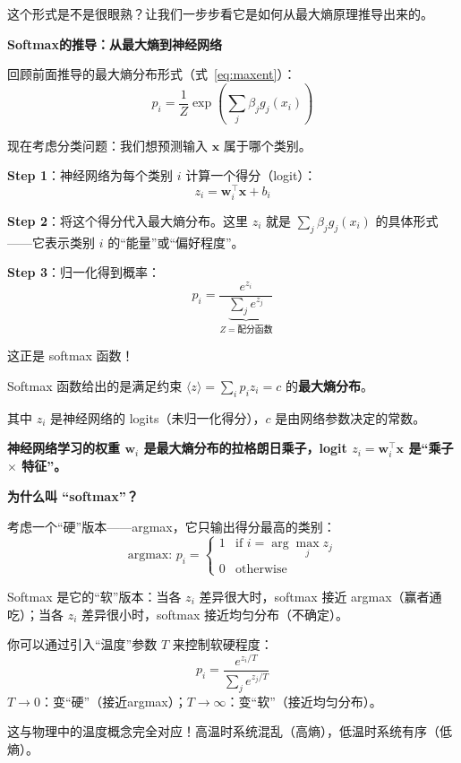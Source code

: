 这个形式是不是很眼熟？让我们一步步看它是如何从最大熵原理推导出来的。

\begin{insightbox}
\textbf{Softmax的推导：从最大熵到神经网络}

回顾前面推导的最大熵分布形式（式~\eqref{eq:maxent}）：
\[
p_i = \frac{1}{Z} \exp\left( \sum_j \beta_j g_j(x_i) \right)
\]

现在考虑分类问题：我们想预测输入 $\bm{x}$ 属于哪个类别。

\textbf{Step 1}：神经网络为每个类别 $i$ 计算一个得分（logit）：
\[
z_i = \bm{w}_i^\top \bm{x} + b_i
\]

\textbf{Step 2}：将这个得分代入最大熵分布。这里 $z_i$ 就是 $\sum_j \beta_j g_j(x_i)$ 的具体形式——它表示类别 $i$ 的“能量”或“偏好程度”。

\textbf{Step 3}：归一化得到概率：
\[
p_i = \frac{e^{z_i}}{\underbrace{\sum_j e^{z_j}}_{Z = \text{配分函数}}}
\]

这正是 softmax 函数！
\end{insightbox}

\begin{unification}[title=Softmax的最大熵解释]
Softmax 函数给出的是满足约束 $\langle z \rangle = \sum_i p_i z_i = c$ 的\textbf{最大熵分布}。

其中 $z_i$ 是神经网络的 logits（未归一化得分），$c$ 是由网络参数决定的常数。

\textbf{神经网络学习的权重 $\bm{w}_i$ 是最大熵分布的拉格朗日乘子，logit $z_i = \bm{w}_i^\top \bm{x}$ 是“乘子 $\times$ 特征”。}
\end{unification}

\begin{physicalmeaning}
\textbf{为什么叫 “softmax”？}

考虑一个“硬”版本——argmax，它只输出得分最高的类别：
\[
\text{argmax: } p_i = \begin{cases} 1 & \text{if } i = \arg\max_j z_j \\ 0 & \text{otherwise} \end{cases}
\]

Softmax 是它的“软”版本：当各 $z_i$ 差异很大时，softmax 接近 argmax（赢者通吃）；当各 $z_i$ 差异很小时，softmax 接近均匀分布（不确定）。

你可以通过引入“温度”参数 $T$ 来控制软硬程度：
\[
p_i = \frac{e^{z_i / T}}{\sum_j e^{z_j / T}}
\]
$T \to 0$：变“硬”（接近argmax）；$T \to \infty$：变“软”（接近均匀分布）。

这与物理中的温度概念完全对应！高温时系统混乱（高熵），低温时系统有序（低熵）。
\end{physicalmeaning}

